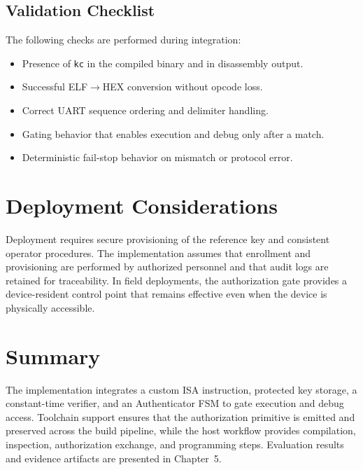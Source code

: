 \subsection{Validation Checklist}
The following checks are performed during integration:
\begin{itemize}
  \item Presence of \texttt{kc} in the compiled binary and in disassembly output.
  \item Successful ELF$\rightarrow$HEX conversion without opcode loss.
  \item Correct UART sequence ordering and delimiter handling.
  \item Gating behavior that enables execution and debug only after a match.
  \item Deterministic fail-stop behavior on mismatch or protocol error.
\end{itemize}

\section{Deployment Considerations}
Deployment requires secure provisioning of the reference key and consistent operator
procedures. The implementation assumes that enrollment and provisioning are performed by
authorized personnel and that audit logs are retained for traceability. In field deployments,
the authorization gate provides a device-resident control point that remains effective even
when the device is physically accessible.

\section{Summary}
The implementation integrates a custom ISA instruction, protected key storage, a constant-time
verifier, and an Authenticator FSM to gate execution and debug access. Toolchain support ensures
that the authorization primitive is emitted and preserved across the build pipeline, while the
host workflow provides compilation, inspection, authorization exchange, and programming steps.
Evaluation results and evidence artifacts are presented in Chapter~5.

